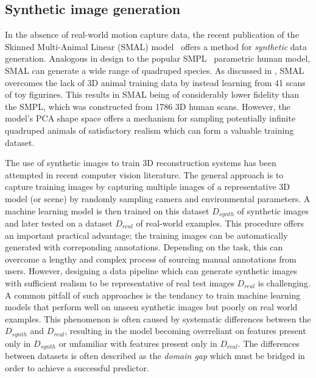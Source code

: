     


\subsection{Synthetic image generation}

    In the absence of real-world motion capture data, the recent publication of the Skinned Multi-Animal Linear (SMAL) model~\cite{zuffi2017menagerie} offers a method for \emph{synthetic} data generation. Analogous in design to the popular SMPL~\cite{loper15smpl} parametric human model, SMAL can generate a wide range of quadruped species. As discussed in , SMAL overcomes the lack of 3D animal training data by instead learning from 41 scans of toy figurines. This results in SMAL being of considerably lower fidelity than the SMPL, which was constructed from 1786 3D human scans. However, the model's PCA shape space offers a mechanism for sampling potentially infinite quadruped animals of satisfactory realism which can form a valuable training dataset.
    
    The use of synthetic images to train 3D reconstruction systems has been attempted in recent computer vision literature. The general approach is to capture training images by capturing multiple images of a representative 3D model (or scene) by randomly sampling camera and environmental parameters. A machine learning model is then trained on this dataset $D_{synth}$ of synthetic images and later tested on a dataset $D_{real}$ of real-world examples. This procedure offers an important practical advantage; the training images can be automatically generated with correponding annotations. Depending on the task, this can overcome a lengthy and complex process of sourcing manual annotations from users. However, designing a data pipeline which can generate synthetic images with sufficient realism to be representative of real test images $D_{real}$ is challenging. A common pitfall of such approaches is the tendancy to train machine learning models that perform well on unseen synthetic images but poorly on real world examples. This phenomenon is often caused by systematic differences between the $D_{synth}$ and $D_{real}$, resulting in the model becoming overreliant on features present only in $D_{synth}$ or unfamiliar with features present only in $D_{real}$. The differences between datasets is often described as the \emph{domain gap} which must be bridged in order to achieve a successful predictor. 

